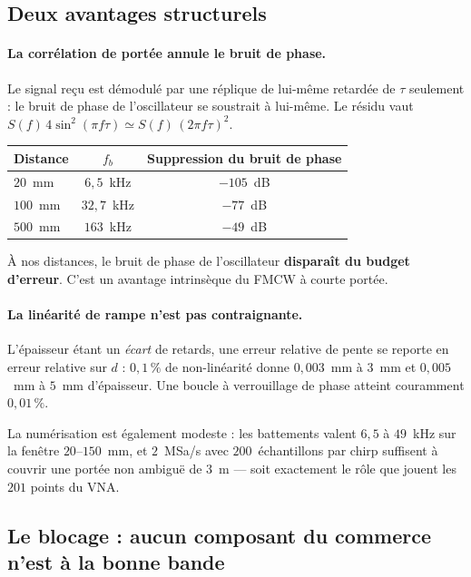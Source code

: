 \documentclass[11pt,a4paper]{article}
\begin{document}
\subsection{Deux avantages structurels}

\paragraph{La corrélation de portée annule le bruit de phase.} Le signal reçu
est démodulé par une réplique de lui-même retardée de $\tau$ seulement : le
bruit de phase de l'oscillateur se soustrait à lui-même. Le résidu vaut
$S(f)\,4\sin^2(\pi f\tau) \simeq S(f)\,(2\pi f\tau)^2$.

\begin{table}[h]
\centering
\begin{tabular}{lcc}
\toprule
Distance & $f_b$ & Suppression du bruit de phase \\
\midrule
$20$~mm  & $6{,}5$~kHz & $-105$~dB \\
$100$~mm & $32{,}7$~kHz & $-77$~dB \\
$500$~mm & $163$~kHz & $-49$~dB \\
\bottomrule
\end{tabular}
\end{table}

À nos distances, le bruit de phase de l'oscillateur \textbf{disparaît du budget
d'erreur}. C'est un avantage intrinsèque du FMCW à courte portée.

\paragraph{La linéarité de rampe n'est pas contraignante.} L'épaisseur étant un
\emph{écart} de retards, une erreur relative de pente se reporte en erreur
relative sur $d$ : $0{,}1\,\%$ de non-linéarité donne $0{,}003$~mm à $3$~mm et
$0{,}005$~mm à $5$~mm d'épaisseur. Une boucle à verrouillage de phase atteint
couramment $0{,}01\,\%$.

La numérisation est également modeste : les battements valent $6{,}5$ à
$49$~kHz sur la fenêtre $20$--$150$~mm, et $2$~MSa/s avec $200$~échantillons par
chirp suffisent à couvrir une portée non ambiguë de $3$~m --- soit exactement le
rôle que jouent les $201$ points du VNA.

\subsection{Le blocage : aucun composant du commerce n'est à la bonne bande}
\end{document}
